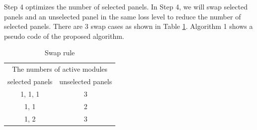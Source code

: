 \documentclass[conference]{IEEEtran}
\begin{document}
Step 4 optimizes the number of selected panels.
In Step 4, we will swap selected panels and an unselected panel in the same loss level to reduce the number of selected panels.
There are 3 swap cases as shown in Table \ref{tab:swap}. Algorithm 1 shows a pseudo code of the proposed algorithm.



\begin{table}[t]
\caption{Swap rule}
\label{tab:swap}
\centering
\begin{tabular}{c|c}
\hline\hline
\multicolumn{2}{c}{The numbers of active modules} \\
selected panels & unselected panels \\ \hline
1, 1, 1 & 3 \\ \hline
1, 1 & 2 \\ \hline
1, 2 & 3 \\ \hline
\end{tabular}
\end{table}





%
\end{document}
